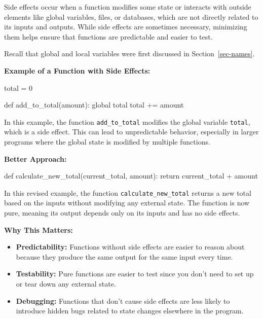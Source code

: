\documentclass[
  letterpaper,
  DIV=11,
  numbers=noendperiod]{scrreprt}
\newenvironment{Shaded}{\begin{snugshade}}{\end{snugshade}}
\newcommand{\ControlFlowTok}[1]{\textcolor[rgb]{0.00,0.23,0.31}{#1}}
\newcommand{\DecValTok}[1]{\textcolor[rgb]{0.68,0.00,0.00}{#1}}
\newcommand{\KeywordTok}[1]{\textcolor[rgb]{0.00,0.23,0.31}{#1}}
\newcommand{\NormalTok}[1]{\textcolor[rgb]{0.00,0.23,0.31}{#1}}
\newcommand{\OperatorTok}[1]{\textcolor[rgb]{0.37,0.37,0.37}{#1}}
\providecommand{\tightlist}{%
  \setlength{\itemsep}{0pt}\setlength{\parskip}{0pt}}\usepackage{longtable,booktabs,array}
\begin{document}
Side effects occur when a function modifies some state or interacts with
outside elements like global variables, files, or databases, which are
not directly related to its inputs and outputs. While side effects are
sometimes necessary, minimizing them helps ensure that functions are
predictable and easier to test.

Recall that global and local variables were first discussed in
Section~\ref{sec-names}.

\textbf{Example of a Function with Side Effects:}

\begin{Shaded}
\begin{Highlighting}[]
\NormalTok{total }\OperatorTok{=} \DecValTok{0}

\KeywordTok{def}\NormalTok{ add\_to\_total(amount):}
    \KeywordTok{global}\NormalTok{ total}
\NormalTok{    total }\OperatorTok{+=}\NormalTok{ amount}
\end{Highlighting}
\end{Shaded}

In this example, the function \texttt{add\_to\_total} modifies the
global variable \texttt{total}, which is a side effect. This can lead to
unpredictable behavior, especially in larger programs where the global
state is modified by multiple functions.

\textbf{Better Approach:}

\begin{Shaded}
\begin{Highlighting}[]
\KeywordTok{def}\NormalTok{ calculate\_new\_total(current\_total, amount):}
    \ControlFlowTok{return}\NormalTok{ current\_total }\OperatorTok{+}\NormalTok{ amount}
\end{Highlighting}
\end{Shaded}

In this revised example, the function \texttt{calculate\_new\_total}
returns a new total based on the inputs without modifying any external
state. The function is now pure, meaning its output depends only on its
inputs and has no side effects.

\textbf{Why This Matters:}

\begin{itemize}
\tightlist
\item
  \textbf{Predictability:} Functions without side effects are easier to
  reason about because they produce the same output for the same input
  every time.
\item
  \textbf{Testability:} Pure functions are easier to test since you
  don't need to set up or tear down any external state.
\item
  \textbf{Debugging:} Functions that don't cause side effects are less
  likely to introduce hidden bugs related to state changes elsewhere in
  the program.
\end{itemize}
\end{document}
